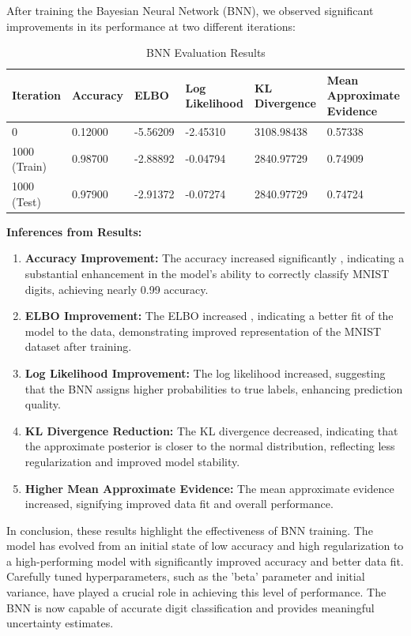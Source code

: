 \documentclass{article}
\begin{document}
After training the Bayesian Neural Network (BNN), we observed significant improvements in its performance at two different iterations:

\begin{table}[h]
\centering
\caption{BNN Evaluation Results}
\label{tab:bnn-eval}
\begin{tabular}{|l|l|l|l|l|l|}
\hline
\textbf{Iteration} & \textbf{Accuracy} & \textbf{ELBO} & \textbf{Log Likelihood} & \textbf{KL Divergence} & \textbf{Mean Approximate Evidence} \\
\hline
0 & 0.12000 & -5.56209 & -2.45310 & 3108.98438 & 0.57338 \\
\hline
1000 (Train) & 0.98700 & -2.88892 & -0.04794 & 2840.97729 & 0.74909 \\
\hline
1000 (Test) & 0.97900 & -2.91372 & -0.07274 & 2840.97729 & 0.74724 \\
\hline
\end{tabular}
\end{table}
\textbf{Inferences from Results:}

\begin{enumerate}
  \item \textbf{Accuracy Improvement:} The accuracy increased significantly , indicating a substantial enhancement in the model's ability to correctly classify MNIST digits, achieving nearly 0.99  accuracy.
  
  \item \textbf{ELBO Improvement:} The ELBO increased , indicating a better fit of the model to the data, demonstrating improved representation of the MNIST dataset after training.
  
  \item \textbf{Log Likelihood Improvement:} The log likelihood increased, suggesting that the BNN assigns higher probabilities to true labels, enhancing prediction quality.
  
  \item \textbf{KL Divergence Reduction:} The KL divergence decreased, indicating that the approximate posterior is closer to the normal distribution, reflecting less regularization and improved model stability.
  
  \item \textbf{Higher Mean Approximate Evidence:} The mean approximate evidence increased, signifying improved data fit and overall performance.
\end{enumerate}

In conclusion, these results highlight the effectiveness of BNN training. The model has evolved from an initial state of low accuracy and high regularization to a high-performing model with significantly improved accuracy and better data fit. Carefully tuned hyperparameters, such as the 'beta' parameter and initial variance, have played a crucial role in achieving this level of performance. The BNN is now capable of accurate digit classification and provides meaningful uncertainty estimates.
\end{document}
